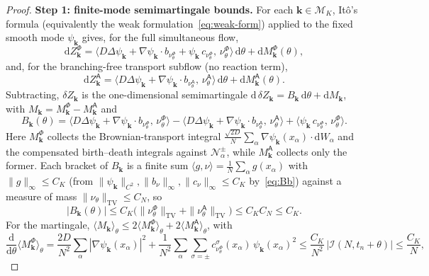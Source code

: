 \documentclass[a4paper,fleqn]{cas-sc}
\theoremstyle{definition}
\theoremstyle{remark}
\begin{document}
\begin{proof}
\medskip
\noindent\textbf{Step 1: finite-mode semimartingale bounds.}
For each $\mathbf k\in\mathcal M_K$, It\^o's formula (equivalently the weak
formulation~\eqref{eq:weak-form}) applied to the fixed smooth mode $\psi_{\mathbf k}$ gives,
for the full simultaneous flow,
\[
\mathrm dZ_{\mathbf k}^\Phi
=\bigl\langle D\Delta\psi_{\mathbf k}+\nabla\psi_{\mathbf k}\!\cdot\! b_{\nu^\Phi_\theta}
   +\psi_{\mathbf k}\,c_{\nu^\Phi_\theta},\,\nu^\Phi_\theta\bigr\rangle\,\mathrm d\theta
 +\mathrm dM_{\mathbf k}^\Phi(\theta),
\]
and, for the branching-free transport subflow (no reaction term),
\[
\mathrm dZ_{\mathbf k}^{\mathsf A}
=\bigl\langle D\Delta\psi_{\mathbf k}+\nabla\psi_{\mathbf k}\!\cdot\! b_{\nu^{\mathsf A}_\theta},\,
   \nu^{\mathsf A}_\theta\bigr\rangle\,\mathrm d\theta+\mathrm dM_{\mathbf k}^{\mathsf A}(\theta).
\]
Subtracting, $\delta Z_{\mathbf k}$ is the one-dimensional semimartingale
$\mathrm d\,\delta Z_{\mathbf k}=B_{\mathbf k}\,\mathrm d\theta+\mathrm dM_{\mathbf k}$, with
$M_{\mathbf k}=M_{\mathbf k}^\Phi-M_{\mathbf k}^{\mathsf A}$ and
\[
B_{\mathbf k}(\theta)
=\bigl\langle D\Delta\psi_{\mathbf k}+\nabla\psi_{\mathbf k}\!\cdot\! b_{\nu^\Phi_\theta},\,\nu^\Phi_\theta\bigr\rangle
-\bigl\langle D\Delta\psi_{\mathbf k}+\nabla\psi_{\mathbf k}\!\cdot\! b_{\nu^{\mathsf A}_\theta},\,\nu^{\mathsf A}_\theta\bigr\rangle
+\bigl\langle\psi_{\mathbf k}\,c_{\nu^\Phi_\theta},\,\nu^\Phi_\theta\bigr\rangle .
\]
Here $M_{\mathbf k}^\Phi$ collects the Brownian-transport integral
$\tfrac{\sqrt{2D}}N\sum_\alpha\nabla\psi_{\mathbf k}(x_\alpha)\!\cdot\!\mathrm dW_\alpha$ and the
compensated birth--death integrals against $\mathcal N^\pm_\alpha$, while
$M_{\mathbf k}^{\mathsf A}$ collects only the former. Each bracket of $B_{\mathbf k}$ is a finite
sum $\langle g,\nu\rangle=\frac1N\sum_\alpha g(x_\alpha)$ with $\|g\|_\infty\le C_K$ (from
$\|\psi_{\mathbf k}\|_{C^2},\|b_\nu\|_\infty,\|c_\nu\|_\infty\le C_K$ by~\eqref{eq:Bb})
against a measure of mass $\|\nu_\theta\|_{\mathrm{TV}}\le C_N$, so
\[
|B_{\mathbf k}(\theta)|
\le C_K\bigl(\|\nu^\Phi_\theta\|_{\mathrm{TV}}+\|\nu^{\mathsf A}_\theta\|_{\mathrm{TV}}\bigr)
\le C_KC_N \leq C_K.
\]
For the martingale, $\langle M_{\mathbf k}\rangle_\theta\le2\langle M_{\mathbf k}^\Phi\rangle_\theta+2\langle M_{\mathbf k}^{\mathsf A}\rangle_\theta$, with
\[
\frac{\mathrm d}{\mathrm d\theta}\langle M_{\mathbf k}^\Phi\rangle_\theta
=\frac{2D}{N^2}\sum_\alpha|\nabla\psi_{\mathbf k}(x_\alpha)|^2
+\frac1{N^2}\sum_\alpha\sum_{\sigma=\pm}c^\sigma_{\nu^\Phi_\theta}(x_\alpha)\,\psi_{\mathbf k}(x_\alpha)^2
\le\frac{C_K}{N^2}\,|\mathcal I(N,t_n+\theta)|\le\frac{C_K}N ,
\]
\end{proof}
\end{document}
